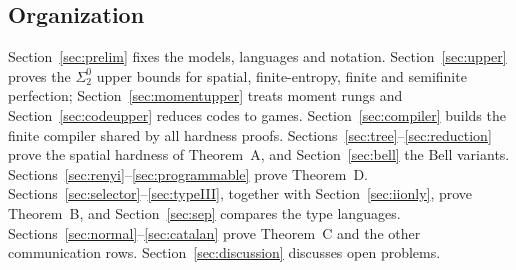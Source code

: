 \subsection{Organization}
Section~\ref{sec:prelim} fixes the models, languages and notation. Section~\ref{sec:upper} proves the $\Sigma^0_2$ upper bounds for spatial, finite-entropy, finite and semifinite perfection; Section~\ref{sec:momentupper} treats moment rungs and Section~\ref{sec:codeupper} reduces codes to games. Section~\ref{sec:compiler} builds the finite compiler shared by all hardness proofs. Sections~\ref{sec:tree}--\ref{sec:reduction} prove the spatial hardness of Theorem~A, and Section~\ref{sec:bell} the Bell variants. Sections~\ref{sec:renyi}--\ref{sec:programmable} prove Theorem~D. Sections~\ref{sec:selector}--\ref{sec:typeIII}, together with Section~\ref{sec:iionly}, prove Theorem~B, and Section~\ref{sec:sep} compares the type languages. Sections~\ref{sec:normal}--\ref{sec:catalan} prove Theorem~C and the other communication rows. Section~\ref{sec:discussion} discusses open problems.
